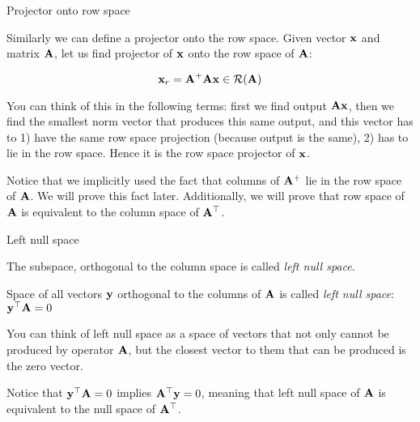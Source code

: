 \documentclass{beamer}
\begin{document}
\begin{frame}{Projector onto row space}
	\begin{flushleft}
		
		Similarly we can define a projector onto the row space. Given vector $\mathbf{x}$ and matrix $\mathbf{A}$, let us find projector of $\mathbf{x}$ onto the row space of $\mathbf{A}$:
		
		\begin{equation}
			\mathbf{x}_r = \mathbf{A}^+\mathbf{A} \mathbf{x} \in \mathcal{R}(\mathbf{A})
		\end{equation}
		
		You can think of this in the following terms: first we find output $\mathbf{A} \mathbf{x}$, then we find the smallest norm vector that produces this same output, and this vector has to 1) have the same row space projection (because output is the same), 2) has to lie in the row space. Hence it is the row space projector of $\mathbf{x}$.
		
		\bigskip
		
		Notice that we implicitly used the fact that columns of $\mathbf{A}^+$ lie in the row space of $\mathbf{A}$. We will prove this fact later. Additionally, we will prove that row space of $\mathbf{A}$ is equivalent to the column space of $\mathbf{A}^\top$.
		
	\end{flushleft}
\end{frame}




\begin{frame}{Left null space}
	\begin{flushleft}
		
		The subspace, orthogonal to the column space is called \emph{left null space}.
		
		\bigskip
		
		\begin{definition}
			Space of all vectors $\mathbf{y}$ orthogonal to the columns of $\mathbf{A}$ is called \emph{left null space}: $\mathbf{y}^\top\mathbf{A} = 0$
		\end{definition}
		
		You can think of left null space as a space of vectors that not only cannot be produced by operator $\mathbf{A}$, but the closest vector to them that can be produced is the zero vector.
		
		\bigskip
		
		Notice that $\mathbf{y}^\top \mathbf{A} = 0$ implies $\mathbf{A}^\top \mathbf{y} = 0$, meaning that left null space of $\mathbf{A}$ is equivalent to the null space of $\mathbf{A}^\top$.
		
		
	\end{flushleft}
\end{frame}
\end{document}
